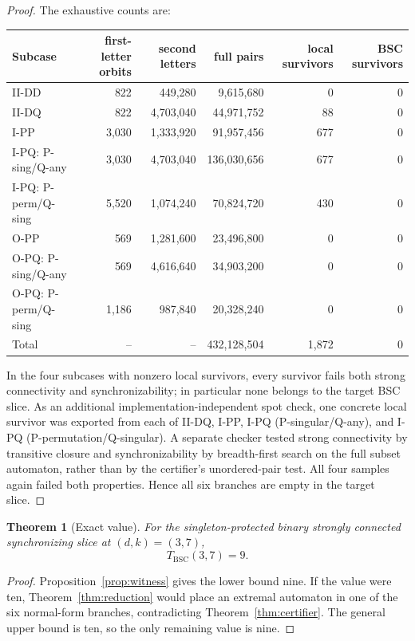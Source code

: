\documentclass[11pt]{article}
\newtheorem{theorem}{Theorem}
\theoremstyle{definition}
\theoremstyle{remark}
\newcommand{\BSC}{\mathrm{BSC}}
\begin{document}
\begin{proof}
The exhaustive counts are:
\begin{center}
\small
\begin{tabular}{lrrrrr}
\toprule
Subcase & first-letter orbits & second letters & full pairs & local survivors & BSC survivors\\
\midrule
II-DD & 822 & 449,280 & 9,615,680 & 0 & 0\\
II-DQ & 822 & 4,703,040 & 44,971,752 & 88 & 0\\
I-PP & 3,030 & 1,333,920 & 91,957,456 & 677 & 0\\
I-PQ: P-sing/Q-any & 3,030 & 4,703,040 & 136,030,656 & 677 & 0\\
I-PQ: P-perm/Q-sing & 5,520 & 1,074,240 & 70,824,720 & 430 & 0\\
O-PP & 569 & 1,281,600 & 23,496,800 & 0 & 0\\
O-PQ: P-sing/Q-any & 569 & 4,616,640 & 34,903,200 & 0 & 0\\
O-PQ: P-perm/Q-sing & 1,186 & 987,840 & 20,328,240 & 0 & 0\\
\midrule
Total & -- & -- & 432,128,504 & 1,872 & 0\\
\bottomrule
\end{tabular}
\end{center}
In the four subcases with nonzero local survivors, every survivor fails both strong connectivity and synchronizability; in particular none belongs to the target BSC slice. As an additional implementation-independent spot check, one concrete local survivor was exported from each of II-DQ, I-PP, I-PQ (P-singular/Q-any), and I-PQ (P-permutation/Q-singular). A separate checker tested strong connectivity by transitive closure and synchronizability by breadth-first search on the full subset automaton, rather than by the certifier's unordered-pair test. All four samples again failed both properties. Hence all six branches are empty in the target slice.
\end{proof}

\begin{theorem}[Exact value]\label{thm:exact9}
For the singleton-protected binary strongly connected synchronizing slice at $(d,k)=(3,7)$,
\[
\boxed{T_{\BSC}(3,7)=9}.
\]
\end{theorem}
\begin{proof}
Proposition~\ref{prop:witness} gives the lower bound nine. If the value were ten, Theorem~\ref{thm:reduction} would place an extremal automaton in one of the six normal-form branches, contradicting Theorem~\ref{thm:certifier}. The general upper bound is ten, so the only remaining value is nine.
\end{proof}
\end{document}
